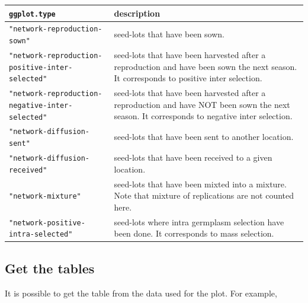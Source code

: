 \documentclass{article}\usepackage[]{graphicx}\usepackage[]{color}
\begin{document}
\begin{center}
\begin{tabular}{ p{} p{} }
\hline
\texttt{ggplot.type} & description \\
\hline

\texttt{"network-reproduction-sown"} & seed-lots that have been sown. \\

\texttt{"network-reproduction-positive-inter-selected"} & seed-lots that have been harvested after a reproduction and have been sown the next season.
It corresponds to positive inter selection. \\

\texttt{"network-reproduction-negative-inter-selected"} & seed-lots that have been harvested after a reproduction and have NOT been sown the next season.
It corresponds to negative inter selection. \\

\texttt{"network-diffusion-sent"} & seed-lots that have been sent to another location. \\

\texttt{"network-diffusion-received"} & seed-lots that have been received to a given location. \\

\texttt{"network-mixture"} & seed-lots that have been mixted into a mixture. Note that mixture of replications are not counted here. \\

\texttt{"network-positive-intra-selected"} & seed-lots where intra germplasm selection have been done.
It corresponds to mass selection. \\

\hline
\end{tabular}
\end{center}


\subsection{Get the tables}

It is possible to get the table from the data used for the plot.
For example,
\end{document}
